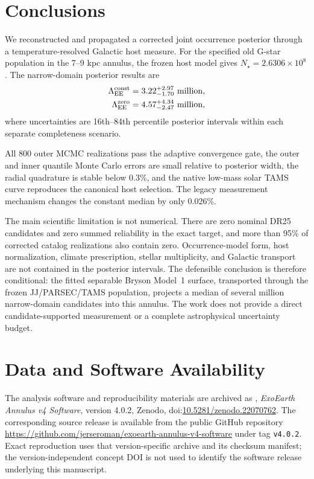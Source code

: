 \section{Conclusions}\label{sec:conclusions}

We reconstructed and propagated a corrected joint occurrence posterior through
a temperature-resolved Galactic host measure. For the specified old G-star
population in the 7--9 kpc annulus, the frozen host model gives
$N_\star=2.6306\times10^8$. The narrow-domain posterior results are
\begin{align}
 \Lambda_{\rm EE}^{\rm const}&=3.22^{+2.97}_{-1.70}\ {\rm million},\nonumber\\
 \Lambda_{\rm EE}^{\rm zero}&=4.57^{+4.34}_{-2.47}\ {\rm million},
\end{align}
where uncertainties are 16th--84th percentile posterior intervals within each
separate completeness scenario.

All 800 outer MCMC realizations pass the adaptive convergence gate, the outer
and inner quantile Monte Carlo errors are small relative to posterior width,
the radial quadrature is stable below 0.3\%, and the native low-mass solar TAMS
curve reproduces the canonical host selection. The legacy measurement mechanism
changes the constant median by only 0.026\%.

The main scientific limitation is not numerical. There are zero nominal DR25
candidates and zero summed reliability in the exact target, and more than 95\%
of corrected catalog realizations also contain zero. Occurrence-model form,
host normalization, climate prescription, stellar multiplicity, and Galactic
transport are not contained in the posterior intervals. The defensible
conclusion is therefore conditional: the fitted separable Bryson Model~1
surface, transported through the frozen JJ/PARSEC/TAMS population, projects a
median of several million narrow-domain candidates into this annulus. The work
does not provide a direct candidate-supported measurement or a complete
astrophysical uncertainty budget.

\section{Data and Software Availability}\label{sec:data}

The analysis software and reproducibility materials are archived as
\citet{Jerse2026ExoEarthSoftware}, \emph{ExoEarth Annulus v4 Software},
version 4.0.2, Zenodo, doi:\href{https://doi.org/10.5281/zenodo.22070762}
{10.5281/zenodo.22070762}. The corresponding source release is available from
the public GitHub repository
\url{https://github.com/jerseroman/exoearth-annulus-v4-software} under tag
\texttt{v4.0.2}. Exact reproduction uses that version-specific archive and its
checksum manifest; the version-independent concept DOI is not used to identify
the software release underlying this manuscript.

